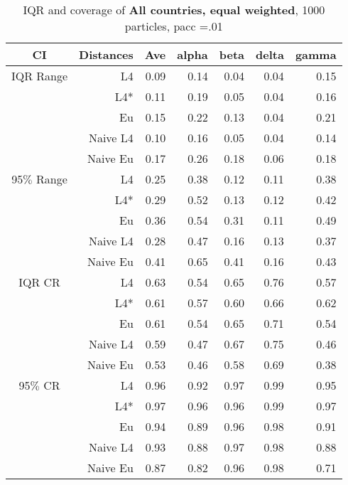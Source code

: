 \documentclass[a4paper,12pt,twoside]{book}
\begin{document}
\begin{table}[H]
\centering
\caption{IQR and coverage of \textbf{All countries, equal weighted}, 1000 particles, pacc =.01}

\begin{tabular}{crrrrrr}
  \hline
{\color{blue}CI} & Distances & Ave & alpha & beta & delta & gamma \\ 
  \hline
{\color{blue}IQR Range} & L4  &0.09 & 0.14 & 0.04 & 0.04 & 0.15 \\ 
  
&L4*  &0.11 & 0.19 & 0.05 & 0.04 & 0.16 \\ 
  
&Eu &     0.15 & 0.22 & 0.13 & 0.04 & 0.21 \\ 
   
&Naive L4&  0.10 & 0.16 & 0.05 & 0.04 & 0.14 \\
&Naive Eu &   0.17 & 0.26 & 0.18 & 0.06 & 0.18 \\ 
 
    {\color{blue}95$\%$ Range} & L4  &0.25 & 0.38 & 0.12 & 0.11 & 0.38 \\ 
  
    &L4*  & 0.29 & 0.52 & 0.13 & 0.12 & 0.42 \\ 
   
&Eu &    0.36 & 0.54 & 0.31 & 0.11 & 0.49 \\ 
  
&Naive L4&      0.28 & 0.47 & 0.16 & 0.13 & 0.37 \\
 
&Naive Eu &   0.41 & 0.65 & 0.41 & 0.16 & 0.43 \\ 
 
   \hline
   
{\color{blue} IQR CR } & L4  &0.63 & 0.54 & 0.65 & 0.76 & 0.57 \\ 
   

&L4*  &    0.61 & 0.57 & 0.60 & 0.66 & 0.62 \\ 
 
 
&Eu &     0.61 & 0.54 & 0.65 & 0.71 & 0.54 \\ 
  
&Naive L4& 0.59 & 0.47 & 0.67 & 0.75 & 0.46 \\ 
&Naive Eu &   0.53 & 0.46 & 0.58 & 0.69 & 0.38 \\ 
  
  

 {\color{blue} 95$\%$ CR }& L4  &0.96 & 0.92 & 0.97 & 0.99 & 0.95 \\ 
 
 
  &L4*  &   0.97 & 0.96 & 0.96 & 0.99 & 0.97 \\ 
 
&Eu &    0.94 & 0.89 & 0.96 & 0.98 & 0.91 \\ 
 
&Naive L4&    
  0.93 & 0.88 & 0.97 & 0.98 & 0.88 \\ 
&Naive Eu &    0.87 & 0.82 & 0.96 & 0.98 & 0.71 \\ 
\end{tabular}

\end{table}
\end{document}
